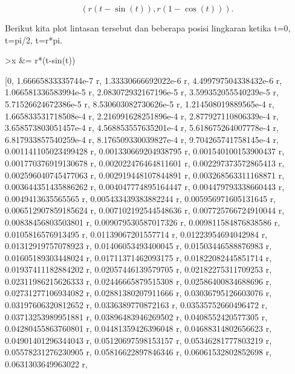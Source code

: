 \documentclass[12pt,arial,letterpaper]{book}
\begin{document}
\begin{eulercomment}
\begin{eulercomment}
\begin{eulercomment}
\begin{eulercomment}
\begin{eulercomment}
\begin{eulercomment}
\begin{eulercomment}
\begin{eulercomment}
\begin{eulercomment}
\begin{eulercomment}
\begin{eulercomment}
\begin{eulercomment}
\begin{eulercomment}
\begin{eulercomment}
\begin{eulercomment}
\begin{eulercomment}
\begin{eulercomment}
\begin{eulercomment}
\begin{eulercomment}
\begin{eulercomment}
\begin{eulercomment}
\begin{eulercomment}
\begin{eulercomment}
\end{eulercomment}
\begin{eulerformula}
\[
(r(t-\sin(t)),r(1-\cos(t))).
\]
\end{eulerformula}
\begin{eulercomment}
Berikut kita plot lintasan tersebut dan beberapa posisi lingkaran
ketika t=0, t=pi/2, t=r*pi.
\end{eulercomment}
\begin{eulerprompt}
>x &= r*(t-sin(t))
\end{eulerprompt}
\begin{euleroutput}
  
          [0, 1.66665833335744e-7 r, 1.33330666692022e-6 r, 
  4.499797504338432e-6 r, 1.066581336583994e-5 r, 
  2.083072932167196e-5 r, 3.599352055540239e-5 r, 
  5.71526624672386e-5 r, 8.530603082730626e-5 r, 
  1.214508019889565e-4 r, 1.665833531718508e-4 r, 
  2.216991628251896e-4 r, 2.877927110806339e-4 r, 
  3.658573803051457e-4 r, 4.568853557635201e-4 r, 
  5.618675264007778e-4 r, 6.817933857540259e-4 r, 
  8.176509330039827e-4 r, 9.704265741758145e-4 r, 
  0.001141105023499428 r, 0.001330669204938795 r, 
  0.001540100153900437 r, 0.001770376919130678 r, 
  0.002022476464811601 r, 0.002297373572865413 r, 
  0.002596040745477063 r, 0.002919448107844891 r, 
  0.003268563311168871 r, 0.003644351435886262 r, 
  0.004047774895164447 r, 0.004479793338660443 r, 0.0049413635565565 r, 
  0.005433439383882244 r, 0.005956971605131645 r, 
  0.006512907859185624 r, 0.007102192544548636 r, 
  0.007725766724910044 r, 0.00838456803503801 r, 
  0.009079530587017326 r, 0.009811584876838586 r, 0.0105816576913495 r, 
  0.01139067201557714 r, 0.01223954694042984 r, 0.01312919757078923 r, 
  0.01406053493400045 r, 0.01503446588876983 r, 0.01605189303448024 r, 
  0.01711371462093175 r, 0.01822082445851714 r, 0.01937411182884202 r, 
  0.02057446139579705 r, 0.02182275311709253 r, 0.02311986215626333 r, 
  0.02446665879515308 r, 0.02586400834688696 r, 0.02731277106934082 r, 
  0.02881380207911666 r, 0.03036795126603076 r, 0.03197606320812652 r, 
  0.0336389770872163 r, 0.03535752660496472 r, 0.03713253989951881 r, 
  0.03896483946269502 r, 0.0408552420577305 r, 0.04280455863760801 r, 
  0.04481359426396048 r, 0.04688314802656623 r, 0.04901401296344043 r, 
  0.05120697598153157 r, 0.05346281777803219 r, 0.05578231276230905 r, 
  0.05816622897846346 r, 0.06061532802852698 r, 0.0631303649963022 r, 

\end{euleroutput}
\end{eulercomment}
\end{eulercomment}
\end{eulercomment}
\end{eulercomment}
\end{eulercomment}
\end{eulercomment}
\end{eulercomment}
\end{eulercomment}
\end{eulercomment}
\end{eulercomment}
\end{eulercomment}
\end{eulercomment}
\end{eulercomment}
\end{eulercomment}
\end{eulercomment}
\end{eulercomment}
\end{eulercomment}
\end{eulercomment}
\end{eulercomment}
\end{eulercomment}
\end{eulercomment}
\end{eulercomment}
\end{document}
